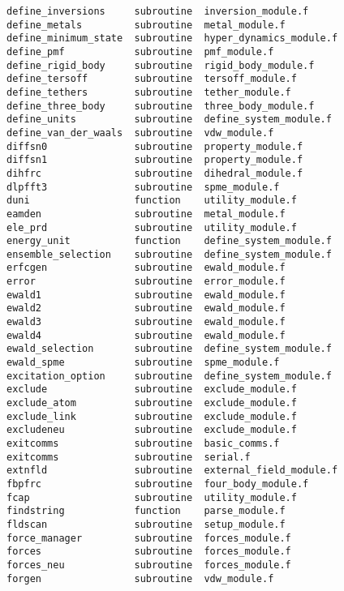 \begin{verbatim}
define_inversions     subroutine  inversion_module.f        
define_metals         subroutine  metal_module.f            
define_minimum_state  subroutine  hyper_dynamics_module.f   
define_pmf            subroutine  pmf_module.f              
define_rigid_body     subroutine  rigid_body_module.f       
define_tersoff        subroutine  tersoff_module.f          
define_tethers        subroutine  tether_module.f           
define_three_body     subroutine  three_body_module.f       
define_units          subroutine  define_system_module.f    
define_van_der_waals  subroutine  vdw_module.f              
diffsn0               subroutine  property_module.f         
diffsn1               subroutine  property_module.f         
dihfrc                subroutine  dihedral_module.f         
dlpfft3               subroutine  spme_module.f             
duni                  function    utility_module.f          
eamden                subroutine  metal_module.f            
ele_prd               subroutine  utility_module.f          
energy_unit           function    define_system_module.f    
ensemble_selection    subroutine  define_system_module.f    
erfcgen               subroutine  ewald_module.f            
error                 subroutine  error_module.f            
ewald1                subroutine  ewald_module.f            
ewald2                subroutine  ewald_module.f            
ewald3                subroutine  ewald_module.f            
ewald4                subroutine  ewald_module.f            
ewald_selection       subroutine  define_system_module.f    
ewald_spme            subroutine  spme_module.f             
excitation_option     subroutine  define_system_module.f    
exclude               subroutine  exclude_module.f          
exclude_atom          subroutine  exclude_module.f          
exclude_link          subroutine  exclude_module.f          
excludeneu            subroutine  exclude_module.f          
exitcomms             subroutine  basic_comms.f             
exitcomms             subroutine  serial.f                  
extnfld               subroutine  external_field_module.f   
fbpfrc                subroutine  four_body_module.f        
fcap                  subroutine  utility_module.f          
findstring            function    parse_module.f            
fldscan               subroutine  setup_module.f            
force_manager         subroutine  forces_module.f           
forces                subroutine  forces_module.f           
forces_neu            subroutine  forces_module.f           
forgen                subroutine  vdw_module.f              

\end{verbatim}
